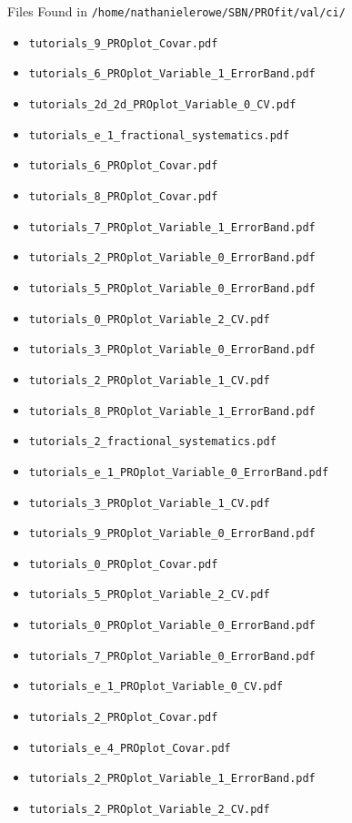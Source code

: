 \documentclass{beamer}
\begin{document}
\begin{frame}{Files Found in \texttt{/home/nathanielerowe/SBN/PROfit/val/ci/}}
\begin{itemize}
    \item \texttt{tutorials\_9\_PROplot\_Covar.pdf}
    \item \texttt{tutorials\_6\_PROplot\_Variable\_1\_ErrorBand.pdf}
    \item \texttt{tutorials\_2d\_2d\_PROplot\_Variable\_0\_CV.pdf}
    \item \texttt{tutorials\_e\_1\_fractional\_systematics.pdf}
    \item \texttt{tutorials\_6\_PROplot\_Covar.pdf}
    \item \texttt{tutorials\_8\_PROplot\_Covar.pdf}
    \item \texttt{tutorials\_7\_PROplot\_Variable\_1\_ErrorBand.pdf}
    \item \texttt{tutorials\_2\_PROplot\_Variable\_0\_ErrorBand.pdf}
    \item \texttt{tutorials\_5\_PROplot\_Variable\_0\_ErrorBand.pdf}
    \item \texttt{tutorials\_0\_PROplot\_Variable\_2\_CV.pdf}
    \item \texttt{tutorials\_3\_PROplot\_Variable\_0\_ErrorBand.pdf}
    \item \texttt{tutorials\_2\_PROplot\_Variable\_1\_CV.pdf}
    \item \texttt{tutorials\_8\_PROplot\_Variable\_1\_ErrorBand.pdf}
    \item \texttt{tutorials\_2\_fractional\_systematics.pdf}
    \item \texttt{tutorials\_e\_1\_PROplot\_Variable\_0\_ErrorBand.pdf}
    \item \texttt{tutorials\_3\_PROplot\_Variable\_1\_CV.pdf}
    \item \texttt{tutorials\_9\_PROplot\_Variable\_0\_ErrorBand.pdf}
    \item \texttt{tutorials\_0\_PROplot\_Covar.pdf}
    \item \texttt{tutorials\_5\_PROplot\_Variable\_2\_CV.pdf}
    \item \texttt{tutorials\_0\_PROplot\_Variable\_0\_ErrorBand.pdf}
    \item \texttt{tutorials\_7\_PROplot\_Variable\_0\_ErrorBand.pdf}
    \item \texttt{tutorials\_e\_1\_PROplot\_Variable\_0\_CV.pdf}
    \item \texttt{tutorials\_2\_PROplot\_Covar.pdf}
    \item \texttt{tutorials\_e\_4\_PROplot\_Covar.pdf}
    \item \texttt{tutorials\_2\_PROplot\_Variable\_1\_ErrorBand.pdf}
    \item \texttt{tutorials\_2\_PROplot\_Variable\_2\_CV.pdf}

\end{itemize}
\end{frame}
\end{document}
